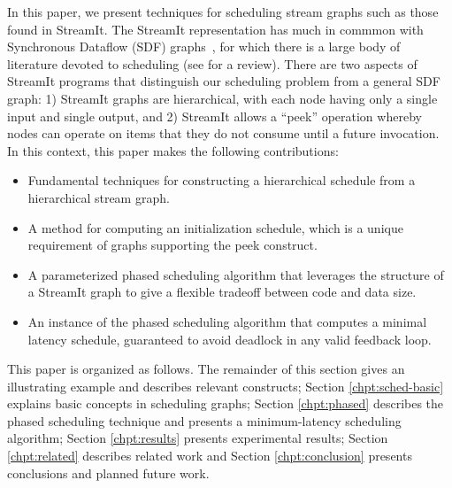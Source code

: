In this paper, we present techniques for scheduling stream graphs such
as those found in StreamIt.  The StreamIt representation has much in
commmon with Synchronous Dataflow (SDF) graphs~\cite{lee87static}, for
which there is a large body of literature devoted to scheduling (see
\cite{bhattacharyya99synthesis} for a review).  There are two aspects
of StreamIt programs that distinguish our scheduling problem from a
general SDF graph: 1) StreamIt graphs are hierarchical, with each node
having only a single input and single output, and 2) StreamIt allows a
``peek'' operation whereby nodes can operate on items that they do not
consume until a future invocation.  In this context, this paper makes
the following contributions:
\begin{itemize}
\item Fundamental techniques for constructing a hierarchical schedule
from a hierarchical stream graph.

\item A method for computing an initialization schedule, which is a
unique requirement of graphs supporting the peek construct.

\item A parameterized phased scheduling algorithm that leverages the
structure of a StreamIt graph to give a flexible tradeoff between code
and data size.

\item An instance of the phased scheduling algorithm that computes a
minimal latency schedule, guaranteed to avoid deadlock in any valid
feedback loop.
\end{itemize}
This paper is organized as follows.  The remainder of this section
gives an illustrating example and describes relevant {\StreamIt}
constructs; Section \ref{chpt:sched-basic} explains basic concepts in
scheduling {\StreamIt} graphs; Section \ref{chpt:phased} describes the
phased scheduling technique and presents a minimum-latency scheduling
algorithm; Section \ref{chpt:results} presents experimental results;
Section \ref{chpt:related} describes related work and Section
\ref{chpt:conclusion} presents conclusions and planned future work.

